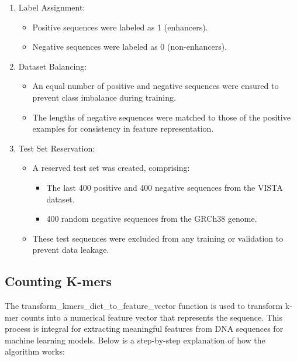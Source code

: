 \documentclass[11pt, a4paper, hidelinks]{article}
\begin{document}
\begin{enumerate}
    \item Label Assignment:
    \begin{itemize}
        \item Positive sequences were labeled as 1 (enhancers).
        \item Negative sequences were labeled as 0 (non-enhancers).
    \end{itemize}

    \item Dataset Balancing:
    \begin{itemize}
        \item An equal number of positive and negative sequences were ensured to prevent class imbalance during training.
        \item The lengths of negative sequences were matched to those of the positive examples for consistency in feature representation.
    \end{itemize}

    \item Test Set Reservation:
    \begin{itemize}
        \item A reserved test set was created, comprising:
        \begin{itemize}
            \item The last 400 positive and 400 negative sequences from the VISTA dataset.
            \item 400 random negative sequences from the GRCh38 genome.
        \end{itemize}
        \item These test sequences were excluded from any training or validation to prevent data leakage.
    \end{itemize}

\end{enumerate}

\subsection{Counting K-mers}\label{subsec:counting-k-mers}

The transform\_kmers\_dict\_to\_feature\_vector function is used to transform k-mer counts into a numerical feature vector that represents the sequence. This process is integral for extracting meaningful features from DNA sequences for machine learning models. Below is a step-by-step explanation of how the algorithm works:
\end{document}
